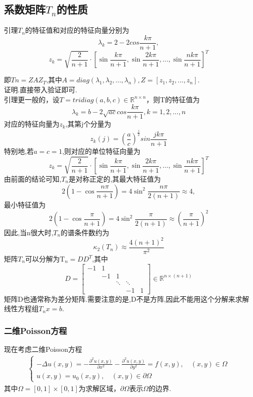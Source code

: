\documentclass[12pt,a4paper]{article}
\begin{document}
\subsection*{ 系数矩阵$T_n$的性质}
{\color{blue}引理}\quad$T_n$的特征值和对应的特征向量分别为
$$
\lambda_k=2-2cos\frac{k\pi}{n+1},
$$
$$
z_{k}=\sqrt{\frac{2}{n+1}} \cdot\left[\sin \frac{k \pi}{n+1}, \sin \frac{2 k \pi}{n+1}, \ldots, \sin \frac{n k \pi}{n+1}\right]^{T}
$$

即$Tn=ZAZ_T$,其中$A=diag(\lambda_1,\lambda_2,...,\lambda_n),Z= [z_1,z_2,...,z_n].$\\
{\color{blue}证明}.直接带入验证即可.\\
{\color{blue}引理}\quad 更一般的，设$T=tridiag(a,b,c)\in \mathbb{R}^{n\times n}$，则T的特征值为
$$
\lambda_k=b-2\sqrt{ac}cos\frac{k\pi}{n+1},k=1,2,...,n
$$
对应的特征向量为$z_k$,其第j个分量为
$$
z_k(j)=(\frac{a}{c})^{\frac{j}{2}}sin\frac{jk\pi}{n+1}
$$
特别地,若$a=c=1$,则对应的单位特征向量为
$$
z_{k}=\sqrt{\frac{2}{n+1}} \cdot\left[\sin \frac{k \pi}{n+1}, \sin \frac{2 k \pi}{n+1}, \ldots, \sin \frac{n k \pi}{n+1}\right]^{T}
$$
由前面的结论可知,$T_n$是对称正定的,其最大特征值为
$$
2\left(1-\cos \frac{n \pi}{n+1}\right)=4 \sin ^{2} \frac{n \pi}{2(n+1)} \approx 4,
$$
最小特征值为
$$
2\left(1-\cos \frac{\pi}{n+1}\right)=4 \sin ^{2} \frac{\pi}{2(n+1)} \approx\left(\frac{\pi}{n+1}\right)^{2}
$$
因此,当n很大时,$T_n$的谱条件数约为
$$
\kappa_{2}\left(T_{n}\right) \approx \frac{4(n+1)^{2}}{\pi^{2}}
$$
矩阵$T_n$可以分解为T$_n=DD^T$,其中
$$
D=\left[\begin{array}{ccccc}{-1} & {1} & {} & {} & {} \\ {} & {-1} & {1} & {} \\ {} & {} & {\ddots} & {\ddots} \\ {} & {} & {} & {-1} & {1}\end{array}\right] \in \mathbb{R}^{n \times(n+1)}
$$
矩阵D也通常称为{\color{blue}差分矩阵}.需要注意的是,D不是方阵,因此不能用这个分解来求解线性方程组$T_nx=b.$
\subsubsection{二维Poisson方程}

现在考虑二维Poisson方程
\begin{align}
\left\{\begin{array}{l}{-\Delta u(x, y)=-\frac{\partial^{2} u(x, y)}{\partial x^{2}}-\frac{\partial^{2} u(x, y)}{\partial y^{2}}=f(x, y), \quad(x, y) \in \Omega} \\ {u(x, y)=u_{0}(x, y), \quad(x, y) \in \partial \Omega}\end{array}\right.
\tag{6.4}
\end{align}
其中$\Omega=[0,1] \times[0,1]$为求解区域，$\partial \Omega$表示$\Omega$的边界.
\end{document}
